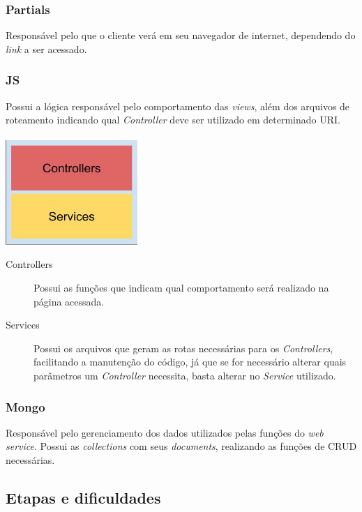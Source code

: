 \documentclass[
	12pt,				%
	oneside,			%
	a4paper,			%
	brazil				%
]{abntex2}
\begin{document}
\subsubsection{Partials}

Responsável pelo que o cliente verá em seu navegador de internet, dependendo do \textit{link} a ser acessado.

\subsubsection{JS}

Possui a lógica responsável pelo comportamento das \textit{views}, além dos arquivos de roteamento indicando qual \textit{Controller} deve ser utilizado em determinado URI.
\\
\\
\includegraphics[width=5cm, center]{images/brick_diagram_angular_js}

\begin{description}
\item[Controllers] Possui as funções que indicam qual comportamento será realizado na página acessada. 

\item[Services] Possui os arquivos que geram as rotas necessárias para os \textit{Controllers}, facilitando a manutenção do código, já que se for necessário alterar quais parâmetros um \textit{Controller} necessita, basta alterar no \textit{Service} utilizado.

\end{description}

\subsubsection{Mongo}

Responsável pelo gerenciamento dos dados utilizados pelas funções do \textit{web service}. Possui as \textit{collections} com seus \textit{documents}, realizando as funções de CRUD necessárias.

\subsection{Etapas e dificuldades}
\end{document}
